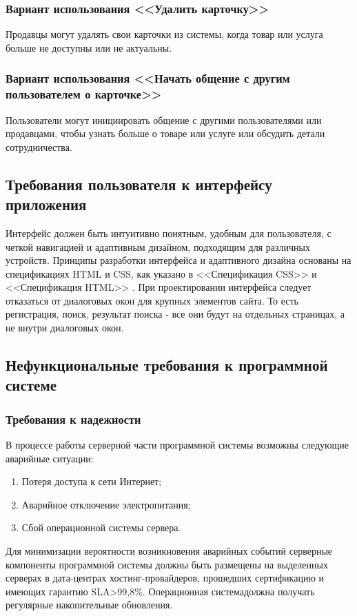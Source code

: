 \subsubsection{Вариант использования <<Удалить карточку>>}
Продавцы могут удалять свои карточки из системы, когда товар или услуга больше не доступны или не актуальны.

\subsubsection{Вариант использования <<Начать общение с другим пользователем о карточке>>}
Пользователи могут инициировать общение с другими пользователями или продавцами, чтобы узнать больше о товаре или услуге или обсудить детали сотрудничества.

\subsection{Требования пользователя к интерфейсу приложения}
Интерфейс должен быть интуитивно понятным, удобным для пользователя, с четкой навигацией и адаптивным дизайном, подходящим для различных устройств. Принципы разработки интерфейса и адаптивного дизайна основаны на спецификациях HTML и CSS, как указано в <<Спецификация CSS>> \cite{cssspecs} и <<Спецификация HTML>> \cite{htmlbook}.
При проектировании интерфейса следует отказаться от диалоговых окон для крупных элементов сайта. То есть регистрация, поиск, результат поиска - все они будут на отдельных страницах, а не внутри диалоговых окон.

\subsection{Нефункциональные требования к программной системе}

\subsubsection{Требования к надежности}
В процессе работы серверной части программной системы возможны следующие аварийные ситуации:
\begin{enumerate}
\item Потеря доступа к сети Интернет;
\item Аварийное отключение электропитания;
\item Сбой операционной системы сервера.
\end{enumerate}

Для минимизации вероятности возникновения аварийных событий серверные компоненты программной системы должны быть размещены на выделенных серверах в дата-центрах хостинг-провайдеров, прошедших сертификацию и имеющих гарантию SLA>99,8\%. Операционная системадолжна получать регулярные накопительные обновления.

